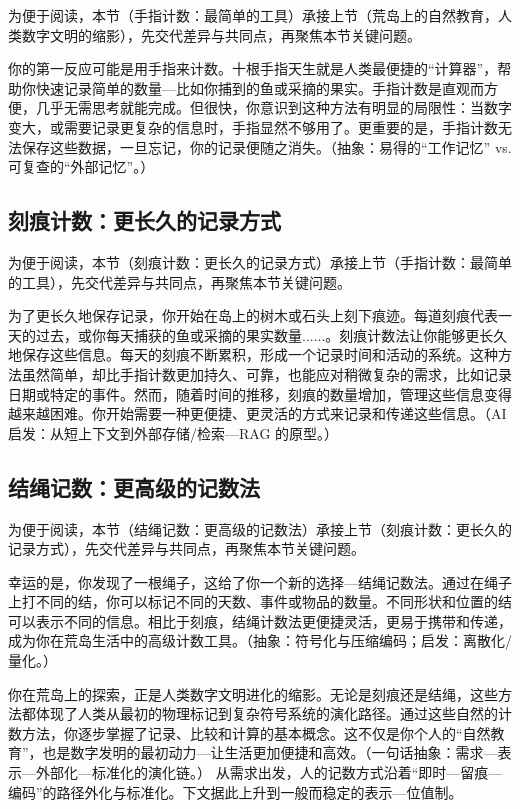 为便于阅读，本节（手指计数：最简单的工具）承接上节（荒岛上的自然教育，人类数字文明的缩影），先交代差异与共同点，再聚焦本节关键问题。

你的第一反应可能是用手指来计数。十根手指天生就是人类最便捷的“计算器”，帮助你快速记录简单的数量---比如你捕到的鱼或采摘的果实。手指计数是直观而方便，几乎无需思考就能完成。但很快，你意识到这种方法有明显的局限性：当数字变大，或需要记录更复杂的信息时，手指显然不够用了。更重要的是，手指计数无法保存这些数据，一旦忘记，你的记录便随之消失。{（抽象：易得的“工作记忆” vs. 可复查的“外部记忆”。）}

\subsection{刻痕计数：更长久的记录方式}

为便于阅读，本节（刻痕计数：更长久的记录方式）承接上节（手指计数：最简单的工具），先交代差异与共同点，再聚焦本节关键问题。

为了更长久地保存记录，你开始在岛上的树木或石头上刻下痕迹。每道刻痕代表一天的过去，或你每天捕获的鱼或采摘的果实数量......。刻痕计数法让你能够更长久地保存这些信息。每天的刻痕不断累积，形成一个记录时间和活动的系统。这种方法虽然简单，却比手指计数更加持久、可靠，也能应对稍微复杂的需求，比如记录日期或特定的事件。然而，随着时间的推移，刻痕的数量增加，管理这些信息变得越来越困难。你开始需要一种更便捷、更灵活的方式来记录和传递这些信息。{（AI 启发：从短上下文到外部存储/检索---RAG 的原型。）}

\subsection{结绳记数：更高级的记数法}

为便于阅读，本节（结绳记数：更高级的记数法）承接上节（刻痕计数：更长久的记录方式），先交代差异与共同点，再聚焦本节关键问题。

幸运的是，你发现了一根绳子，这给了你一个新的选择---结绳记数法。通过在绳子上打不同的结，你可以标记不同的天数、事件或物品的数量。不同形状和位置的结可以表示不同的信息。相比于刻痕，结绳计数法更便捷灵活，更易于携带和传递，成为你在荒岛生活中的高级计数工具。{（抽象：符号化与压缩编码；启发：离散化/量化。）}

你在荒岛上的探索，正是人类数字文明进化的缩影。无论是刻痕还是结绳，这些方法都体现了人类从最初的物理标记到复杂符号系统的演化路径。通过这些自然的计数方法，你逐步掌握了记录、比较和计算的基本概念。这不仅是你个人的“自然教育”，也是数字发明的最初动力---让生活更加便捷和高效。{（一句话抽象：需求—表示—外部化—标准化的演化链。）}
从需求出发，人的记数方式沿着“即时—留痕—编码”的路径外化与标准化。下文据此上升到一般而稳定的表示---位值制。

